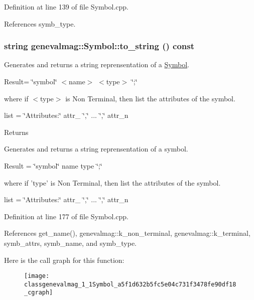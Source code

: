 Definition at line 139 of file Symbol.cpp.



References symb\_\-type.

\hypertarget{classgenevalmag_1_1Symbol_a5f1d632b5fc5e04c731f3478fe90df18}{
\subsubsection[{to\_\-string}]{\setlength{\rightskip}{0pt plus 5cm}string genevalmag::Symbol::to\_\-string () const}}
\label{classgenevalmag_1_1Symbol_a5f1d632b5fc5e04c731f3478fe90df18}
Generates and returns a string reprensentation of a \hyperlink{classgenevalmag_1_1Symbol}{Symbol}.\par
 \par
 Result= \char`\"{}symbol\char`\"{} $<$name$>$ $<$type$>$ \char`\"{};\char`\"{}\par
 \par
 where if $<$type$>$ is Non Terminal, then list the attributes of the symbol.\par
 \par
 list = \char`\"{}Attributes:\char`\"{} attr\_ \char`\"{},\char`\"{} ... \char`\"{},\char`\"{} attr\_\-n\par


\begin{DoxyReturn}{Returns}

\end{DoxyReturn}
Generates and returns a string reprensentation of a symbol.

Result = \char`\"{}symbol\char`\"{} name type \char`\"{};\char`\"{}

where if 'type' is Non Terminal, then list the attributes of the symbol.

list = \char`\"{}Attributes:\char`\"{} attr\_ \char`\"{},\char`\"{} ... \char`\"{},\char`\"{} attr\_\-n 

Definition at line 177 of file Symbol.cpp.



References get\_\-name(), genevalmag::k\_\-non\_\-terminal, genevalmag::k\_\-terminal, symb\_\-attrs, symb\_\-name, and symb\_\-type.



Here is the call graph for this function:\nopagebreak
\begin{figure}[H]
\begin{center}
\leavevmode
\texttt{[image: classgenevalmag\_1\_1Symbol\_a5f1d632b5fc5e04c731f3478fe90df18\_cgraph]}
\end{center}
\end{figure}




